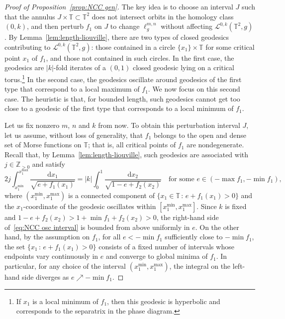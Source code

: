 \documentclass[11pt,letterpaper,oneside]{amsart}
\newcommand{\Z}{\mathbb{Z}}
\newcommand{\T}{\mathbb{T}}
\theoremstyle{definition}
\theoremstyle{remark}
\theoremstyle{definition}
\theoremstyle{remark}
\newcommand{\CL}{\mathcal{L}}
\newcommand{\dif}{\mathrm{d}}
\begin{document}
\begin{proof}[Proof of Proposition~\ref{prop:NCC gen}]
	The key idea is to choose an interval $J$ such that the annulus $J \times \T \subset \T^2$ does not intersect orbits in the homology class $(0,k)$, and then perturb $f_1$ on $J$ to change $\ell^{m,n}_g$ without affecting $\CL^{0,k}(\T^2, g)$.
    By Lemma~\ref{lem:length-liouville}, there are two types of closed geodesics contributing to $\CL^{0,k}(\T^2, g)$: those contained in a circle $\{x_1\}\times\T$ for some critical point $x_1$ of $f_1$, and those not contained in such circles. 
    In the first case, the geodesics are $|k|$-fold iterates of a $(0,1)$ closed geodesic lying on a critical torus.\footnote{If $x_1$ is a local minimum of $f_1$, then this geodesic is hyperbolic and corresponds to the separatrix in the phase diagram.}
    In the second case, the geodesics oscillate around geodesics of the first type that correspond to a local maximum of $f_1$.
    We now focus on this second case. The heuristic is that, for bounded length, such geodesics cannot get too close to a geodesic of the first type that corresponds to a local minimum of $f_1$.

    \medskip
    
    Let us fix nonzero $m$, $n$ and $k$ from now.
    To obtain this perturbation interval $J$, let us assume, without loss of generality, that $f_1$ belongs to the open and dense set of Morse functions on $\T$; that is, all critical points of $f_1$ are nondegenerate.
	Recall that, by Lemma~\ref{lem:length-liouville}, such geodesics are associated with $j \in \Z_{>0}$ and satisfy 
	\begin{equation}\label{eq:NCC osc interval}
		2j \int_{x_1^{\min}}^{x_1^{\max}} \frac{\dif x_1}{\sqrt{e + f_1(x_1)}} = |k| \int_{0}^{1} \frac{\dif x_2}{\sqrt{1 - e + f_2(x_2)}} \quad \text{for some } e \in (- \max f_1, -\min f_1),
	\end{equation}
	where $(x_1^{\min}, x_1^{\max})$ is a connected component of $\{x_1 \in \T \, : \, e + f_1(x_1) > 0\}$ and the $x_1$-coordinate of the geodesic oscillates within $[x_1^{\min}, x_1^{\max}]$.
	Since $k$ is fixed and $1 - e + f_2(x_2) > 1 + \min f_1 + f_2(x_2) > 0$, the right-hand side of~\eqref{eq:NCC osc interval} is bounded from above uniformly in $e$. 
    On the other hand, by the assumption on $f_1$, for all $e < -\min f_1$ sufficiently close to $-\min f_1$, the set $\{x_1 \, : \, e + f_1(x_1) > 0\}$ consists of a fixed number of intervals whose endpoints vary continuously in $e$ and converge to global minima of $f_1$.
    In particular, for any choice of the interval $(x_1^{\min}, x_1^{\max})$, the integral on the left-hand side diverges as $e \nearrow -\min f_1$.


\end{proof}
\end{document}
